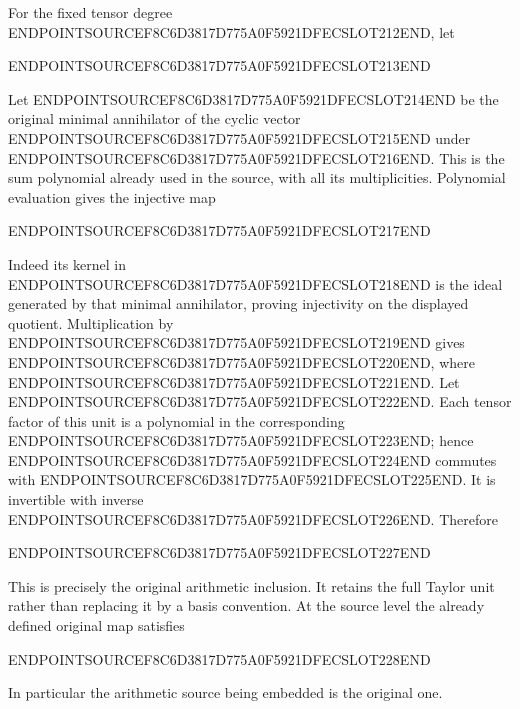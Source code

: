 For the fixed tensor degree ENDPOINTSOURCEF8C6D3817D775A0F5921DFECSLOT212END, let

ENDPOINTSOURCEF8C6D3817D775A0F5921DFECSLOT213END

Let ENDPOINTSOURCEF8C6D3817D775A0F5921DFECSLOT214END be the original minimal annihilator of the cyclic vector ENDPOINTSOURCEF8C6D3817D775A0F5921DFECSLOT215END under ENDPOINTSOURCEF8C6D3817D775A0F5921DFECSLOT216END. This is the sum polynomial already used in the source, with all its multiplicities. Polynomial evaluation gives the injective map

ENDPOINTSOURCEF8C6D3817D775A0F5921DFECSLOT217END

Indeed its kernel in ENDPOINTSOURCEF8C6D3817D775A0F5921DFECSLOT218END is the ideal generated by that minimal annihilator, proving injectivity on the displayed quotient. Multiplication by ENDPOINTSOURCEF8C6D3817D775A0F5921DFECSLOT219END gives ENDPOINTSOURCEF8C6D3817D775A0F5921DFECSLOT220END, where ENDPOINTSOURCEF8C6D3817D775A0F5921DFECSLOT221END. Let ENDPOINTSOURCEF8C6D3817D775A0F5921DFECSLOT222END. Each tensor factor of this unit is a polynomial in the corresponding ENDPOINTSOURCEF8C6D3817D775A0F5921DFECSLOT223END; hence ENDPOINTSOURCEF8C6D3817D775A0F5921DFECSLOT224END commutes with ENDPOINTSOURCEF8C6D3817D775A0F5921DFECSLOT225END. It is invertible with inverse ENDPOINTSOURCEF8C6D3817D775A0F5921DFECSLOT226END. Therefore

ENDPOINTSOURCEF8C6D3817D775A0F5921DFECSLOT227END

This is precisely the original arithmetic inclusion. It retains the full Taylor unit rather than replacing it by a basis convention. At the source level the already defined original map satisfies

ENDPOINTSOURCEF8C6D3817D775A0F5921DFECSLOT228END

In particular the arithmetic source being embedded is the original one.

